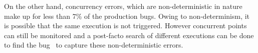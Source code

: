 On the other hand, concurrency errors, which are non-deterministic in nature make up for less than 7\% of the production bugs.
Owing to non-determinism, it is possible that the same execution is not triggered. However concurrent points can still be monitored and a post-facto search of different executions can be done to find the bug~\cite{dpor,systematicDPORconcurrency} to capture these non-deterministic errors.\\ \\



